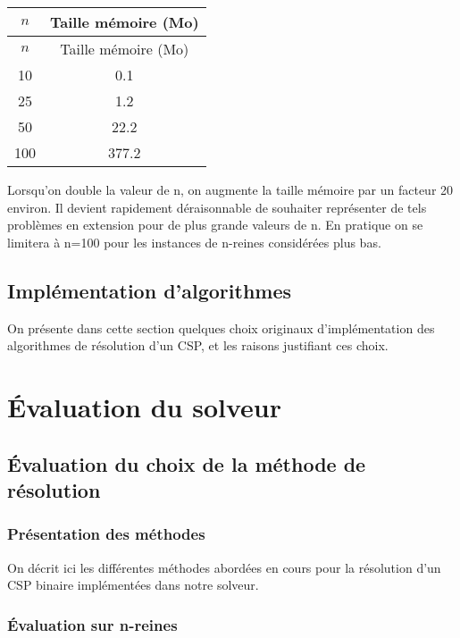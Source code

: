 \documentclass[14pt]{article}
\begin{document}
\begin{longtable}{|c|c|}
	\hline
	$n$ & Taille mémoire (Mo) \\
	\hline
	\endfirsthead
	
	$n$ & Taille mémoire (Mo) \\
	\hline
	\endhead
	
	\hline
	\endfoot
	
	\hline
	\endlastfoot
	
	10  & 0.1 \\
	25  & 1.2 \\
	50  & 22.2 \\
	100  & 377.2 \\
\end{longtable}

Lorsqu'on double la valeur de n, on augmente la taille mémoire par un facteur 20 environ. Il devient rapidement déraisonnable de souhaiter représenter de tels problèmes en extension pour de plus grande valeurs de n. En pratique on se limitera à n=100 pour les instances de n-reines considérées plus bas.


\subsection{Implémentation d'algorithmes}

On présente dans cette section quelques choix originaux d'implémentation des algorithmes de résolution d'un CSP, et les raisons justifiant ces choix.

\clearpage

\section{Évaluation du solveur}

\subsection{Évaluation du choix de la méthode de résolution}

\subsubsection{Présentation des méthodes}

On décrit ici les différentes méthodes abordées en cours pour la résolution d'un CSP binaire implémentées dans notre solveur.

\subsubsection{Évaluation sur n-reines}
\end{document}
